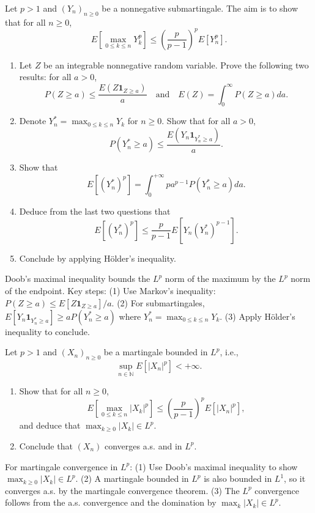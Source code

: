 \begin{exercise}
Let \(p > 1\) and \((Y_n)_{n \geq 0}\) be a nonnegative submartingale. The aim is to show that for all \(n \geq 0\),
\[E\left[\max_{0 \leq k \leq n} Y_k^p\right] \leq \left(\frac{p}{p-1}\right)^p E[Y_n^p].\]
\begin{enumerate}
    \item Let \(Z\) be an integrable nonnegative random variable. Prove the following two results: for all \(a > 0\),
    \[P(Z \geq a) \leq \frac{E(Z\mathbf{1}_{Z \geq a})}{a} \quad \text{and} \quad E(Z) = \int_0^\infty P(Z \geq a) da.\]

    \item Denote \(Y_n^* = \max_{0 \leq k \leq n} Y_k\) for \(n \geq 0\). Show that for all \(a > 0\),
    \[P(Y_n^* \geq a) \leq \frac{E(Y_n\mathbf{1}_{Y_n^* \geq a})}{a}.\]

    \item Show that
    \[E[(Y_n^*)^p] = \int_0^{+\infty} p a^{p-1} P(Y_n^* \geq a) da.\]

    \item Deduce from the last two questions that
    \[E[(Y_n^*)^p] \leq \frac{p}{p-1} E[Y_n (Y_n^*)^{p-1}].\]

    \item Conclude by applying Hölder's inequality.
\end{enumerate}

\begin{reminder}
Doob's maximal inequality bounds the \(L^p\) norm of the maximum by the \(L^p\) norm of the endpoint. Key steps: (1) Use Markov's inequality: \(P(Z \geq a) \leq E[Z\mathbf{1}_{Z \geq a}]/a\). (2) For submartingales, \(E[Y_n \mathbf{1}_{Y_n^* \geq a}] \geq a P(Y_n^* \geq a)\) where \(Y_n^* = \max_{0 \leq k \leq n} Y_k\). (3) Apply Hölder's inequality to conclude.
\end{reminder}
\end{exercise}

\begin{exercise}[Convergence in \(L^p\)]
Let \(p > 1\) and \((X_n)_{n \geq 0}\) be a martingale bounded in \(L^p\), i.e.,
\[\sup_{n \in \mathbb{N}} E[|X_n|^p] < +\infty.\]
\begin{enumerate}
    \item Show that for all \(n \geq 0\),
    \[E\left[\max_{0 \leq k \leq n} |X_k|^p\right] \leq \left(\frac{p}{p-1}\right)^p E[|X_n|^p],\]
    and deduce that \(\max_{k \geq 0} |X_k| \in L^p\).

    \item Conclude that \((X_n)\) converges a.s. and in \(L^p\).
\end{enumerate}

\begin{reminder}
For martingale convergence in \(L^p\): (1) Use Doob's maximal inequality to show \(\max_{k \geq 0} |X_k| \in L^p\). (2) A martingale bounded in \(L^p\) is also bounded in \(L^1\), so it converges a.s. by the martingale convergence theorem. (3) The \(L^p\) convergence follows from the a.s. convergence and the domination by \(\max_k |X_k| \in L^p\).
\end{reminder}
\end{exercise}